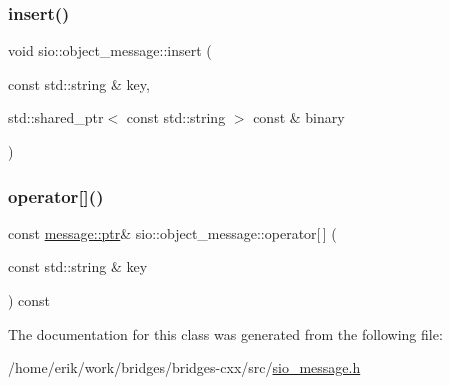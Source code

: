 \mbox{\label{classsio_1_1object__message_aa0c14900ec41c99e1507299a3ee8c7f1}} 
\subsubsection{\texorpdfstring{insert()}{insert()}\hspace{0.1cm}{\footnotesize\ttfamily [5/5]}}
{\footnotesize\ttfamily void sio\+::object\+\_\+message\+::insert (\begin{DoxyParamCaption}\item[{const std\+::string \&}]{key,  }\item[{std\+::shared\+\_\+ptr$<$ const std\+::string $>$ const \&}]{binary }\end{DoxyParamCaption})\hspace{0.3cm}{\ttfamily [inline]}}

\mbox{\label{classsio_1_1object__message_a52c7af95802da3f3e3a56a8509e329ee}} 
\subsubsection{\texorpdfstring{operator[]()}{operator[]()}}
{\footnotesize\ttfamily const \hyperlink{classsio_1_1message_a6340b6fef57e4516eb17928b1885a615}{message\+::ptr}\& sio\+::object\+\_\+message\+::operator\mbox{[}$\,$\mbox{]} (\begin{DoxyParamCaption}\item[{const std\+::string \&}]{key }\end{DoxyParamCaption}) const\hspace{0.3cm}{\ttfamily [inline]}}



The documentation for this class was generated from the following file\+:\begin{DoxyCompactItemize}
\item 
/home/erik/work/bridges/bridges-\/cxx/src/\hyperlink{sio__message_8h}{sio\+\_\+message.\+h}\end{DoxyCompactItemize}
